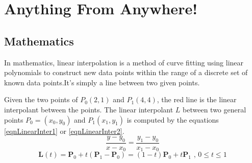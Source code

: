 \chapter{Anything From Anywhere!}
\section{Mathematics}
\begin{note}

In mathematics, linear interpolation is a method of curve fitting using linear polynomials to construct new data points within the range of a discrete set of known data points.It's simply a line between two given points.
\begin{center}
\end{center}
Given the two points of $P_0 (2,1)$ and $P_1 (4,4)$, the red line is the linear interpolant between the points. The linear interpolant  $L$ between two general points $P_0 = (x_0,y_0)$ and $P_1 (x_1,y_1)$ is computed by the equations \ref{eqnLinearInter1} or \ref{eqnLinearInter2}.
\begin{equation} \label{eqnLinearInter1}
\frac{y-y_0}{x-x_0} = \frac{y_1-y_0}{x_1-x_0} 
\end{equation}
\begin{equation} \label{eqnLinearInter2}
\mathbf {L} (t)=\mathbf {P} _{0}+t(\mathbf {P} _{1}-\mathbf {P} _{0})=(1-t)\mathbf {P} _{0}+t\mathbf {P} _{1}{\mbox{ , }}0\leq t\leq 1
\end{equation}
\end{note}

